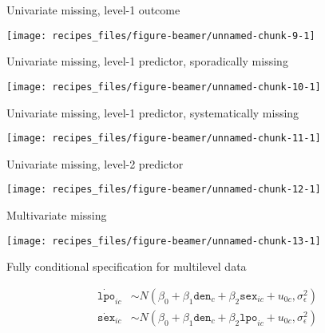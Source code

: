 \documentclass[ignorenonframetext,aspectratio=43]{beamer}
\begin{document}
\begin{frame}{Univariate missing, level-1 outcome}

\begin{center}\texttt{[image: recipes\_files/figure-beamer/unnamed-chunk-9-1]} \end{center}

\end{frame}

\begin{frame}{Univariate missing, level-1 predictor, sporadically
missing}

\begin{center}\texttt{[image: recipes\_files/figure-beamer/unnamed-chunk-10-1]} \end{center}

\end{frame}

\begin{frame}{Univariate missing, level-1 predictor, systematically
missing}

\begin{center}\texttt{[image: recipes\_files/figure-beamer/unnamed-chunk-11-1]} \end{center}

\end{frame}

\begin{frame}{Univariate missing, level-2 predictor}

\begin{center}\texttt{[image: recipes\_files/figure-beamer/unnamed-chunk-12-1]} \end{center}

\end{frame}

\begin{frame}{Multivariate missing}

\begin{center}\texttt{[image: recipes\_files/figure-beamer/unnamed-chunk-13-1]} \end{center}

\end{frame}

\begin{frame}{Fully conditional specification for multilevel data}

\begin{align}
\dot{{\texttt{lpo}}}_{ic} & \sim N(\beta_0 + \beta_1 {{\texttt{den}}}_{c} + \beta_2 {{\texttt{sex}}}_{ic} + u_{0c}, \sigma_\epsilon^2)\\
\dot{{\texttt{sex}}}_{ic} & \sim N(\beta_0 + \beta_1 {{\texttt{den}}}_{c} + \beta_2 {{\texttt{lpo}}}_{ic} + u_{0c}, \sigma_\epsilon^2)
\end{align}

\end{frame}
\end{document}
